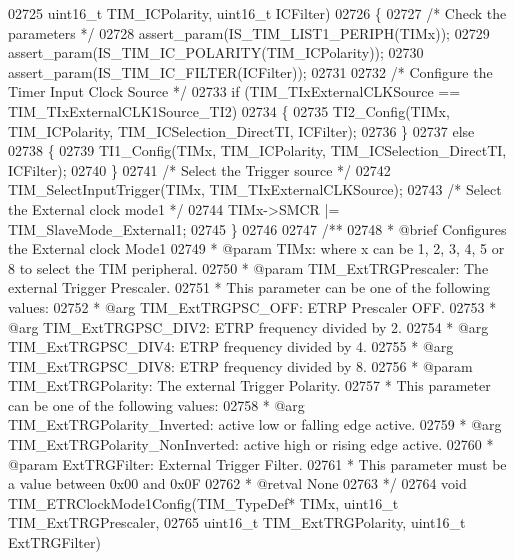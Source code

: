 \begin{DoxyCode}
02725                                 uint16\_t TIM\_ICPolarity, uint16\_t ICFilter)
02726 \{
02727   \textcolor{comment}{/* Check the parameters */}
02728   assert_param(IS\_TIM\_LIST1\_PERIPH(TIMx));
02729   assert_param(IS\_TIM\_IC\_POLARITY(TIM\_ICPolarity));
02730   assert_param(IS\_TIM\_IC\_FILTER(ICFilter));
02731 
02732   \textcolor{comment}{/* Configure the Timer Input Clock Source */}
02733   \textcolor{keywordflow}{if} (TIM\_TIxExternalCLKSource == TIM_TIxExternalCLK1Source_TI2)
02734   \{
02735     TI2_Config(TIMx, TIM\_ICPolarity, TIM_ICSelection_DirectTI, ICFilter);
02736   \}
02737   \textcolor{keywordflow}{else}
02738   \{
02739     TI1_Config(TIMx, TIM\_ICPolarity, TIM_ICSelection_DirectTI, ICFilter);
02740   \}
02741   \textcolor{comment}{/* Select the Trigger source */}
02742   TIM_SelectInputTrigger(TIMx, TIM\_TIxExternalCLKSource);
02743   \textcolor{comment}{/* Select the External clock mode1 */}
02744   TIMx->SMCR |= TIM_SlaveMode_External1;
02745 \}
02746 
02747 \textcolor{comment}{/**}
02748 \textcolor{comment}{  * @brief  Configures the External clock Mode1}
02749 \textcolor{comment}{  * @param  TIMx: where x can be  1, 2, 3, 4, 5 or 8 to select the TIM peripheral.}
02750 \textcolor{comment}{  * @param  TIM\_ExtTRGPrescaler: The external Trigger Prescaler.}
02751 \textcolor{comment}{  *          This parameter can be one of the following values:}
02752 \textcolor{comment}{  *            @arg TIM\_ExtTRGPSC\_OFF: ETRP Prescaler OFF.}
02753 \textcolor{comment}{  *            @arg TIM\_ExtTRGPSC\_DIV2: ETRP frequency divided by 2.}
02754 \textcolor{comment}{  *            @arg TIM\_ExtTRGPSC\_DIV4: ETRP frequency divided by 4.}
02755 \textcolor{comment}{  *            @arg TIM\_ExtTRGPSC\_DIV8: ETRP frequency divided by 8.}
02756 \textcolor{comment}{  * @param  TIM\_ExtTRGPolarity: The external Trigger Polarity.}
02757 \textcolor{comment}{  *          This parameter can be one of the following values:}
02758 \textcolor{comment}{  *            @arg TIM\_ExtTRGPolarity\_Inverted: active low or falling edge active.}
02759 \textcolor{comment}{  *            @arg TIM\_ExtTRGPolarity\_NonInverted: active high or rising edge active.}
02760 \textcolor{comment}{  * @param  ExtTRGFilter: External Trigger Filter.}
02761 \textcolor{comment}{  *          This parameter must be a value between 0x00 and 0x0F}
02762 \textcolor{comment}{  * @retval None}
02763 \textcolor{comment}{  */}
02764 \textcolor{keywordtype}{void} TIM_ETRClockMode1Config(TIM\_TypeDef* TIMx, uint16\_t TIM\_ExtTRGPrescaler,
02765                             uint16\_t TIM\_ExtTRGPolarity, uint16\_t ExtTRGFilter)

\end{DoxyCode}
